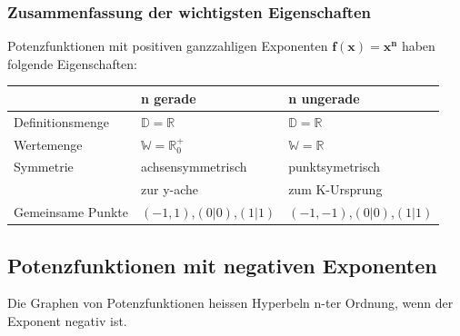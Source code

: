 \begin{multicols}{2}
    \subsubsection{Zusammenfassung der wichtigsten Eigenschaften}
    \vspace{-4mm}
    Potenzfunktionen mit positiven ganzzahligen Exponenten $\boldsymbol{f(x) = x^n}$ haben folgende Eigenschaften:
    \begin{tabularx}{0.5\textwidth} {
            | >{\raggedright\arraybackslash}X
            | >{\raggedright\arraybackslash}X
            | >{\raggedright\arraybackslash}X |}
        \hline
                          & \textbf{n gerade}                 & \textbf{n ungerade}       \\ \hline
        Definitionsmenge  & $\mathbb{D} = \mathbb{R}$         & $\mathbb{D} = \mathbb{R}$ \\ \hline
        Wertemenge        & $\mathbb{W} = \mathbb{R}^{+}_{0}$ & $\mathbb{W} = \mathbb{R}$ \\ \hline
        Symmetrie         & achsensymmetrisch                 & punktsymetrisch           \\
                          & zur y-ache                        & zum K-Ursprung            \\ \hline
        Gemeinsame Punkte & $(-1,1)$,$(0|0)$,$(1|1)$          & $(-1,-1)$,$(0|0)$,$(1|1)$ \\ \hline
    \end{tabularx}
    \subsection{Potenzfunktionen mit negativen Exponenten}
    \vspace{-4mm}
    Die Graphen von Potenzfunktionen heissen Hyperbeln n-ter Ordnung, wenn der Exponent negativ ist.

\end{multicols}
